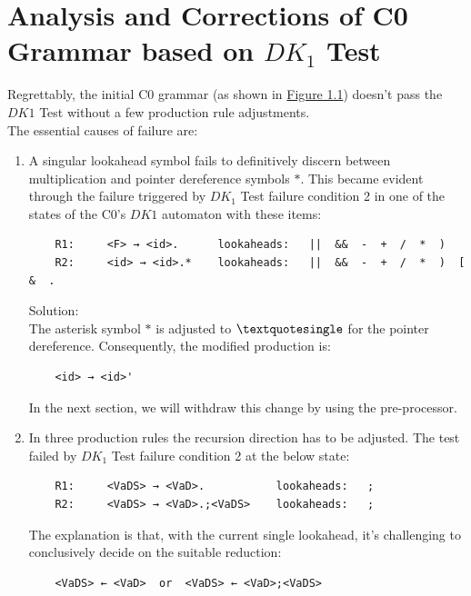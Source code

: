 \newpage


\section{Analysis and Corrections of C0 Grammar based on \(DK_{1}\) Test}\label{sec:Analysis and Corrections of C0 Grammar based on DK1 Test}

Regrettably, the initial C0 grammar (as shown in \hyperref[fig:grammar_c0]{Figure 1.1}) doesn’t pass the \(DK1\) Test without a few production rule adjustments.\\

The essential causes of failure are:

\begin{enumerate}
    \item A singular lookahead symbol fails to definitively discern between multiplication and pointer dereference symbols \(\ast\). This became evident through the failure triggered by \({DK_{1}}\) Test failure condition 2 in one of the states of the C0's \(DK1\) automaton with these items:
    \begin{verbatim}
    R1:     <F> → <id>.      lookaheads:   ||  &&  -  +  /  *  )
    R2:     <id> → <id>.*    lookaheads:   ||  &&  -  +  /  *  )  [  &  .
    \end{verbatim}
    Solution: \\
    The asterisk symbol \(\ast\) is adjusted to \(\textquotesingle\) for the pointer dereference. Consequently, the modified production is:
    \begin{verbatim}
    <id> → <id>'
    \end{verbatim}
    In the next section, we will withdraw this change by using the pre-processor.

    \item In three production rules the recursion direction has to be adjusted.
    The test failed by \({DK_{1}}\) Test failure condition 2 at the below state:
    \begin{verbatim}
    R1:     <VaDS> → <VaD>.           lookaheads:   ;
    R2:     <VaDS> → <VaD>.;<VaDS>    lookaheads:   ;
    \end{verbatim}
    The explanation is that, with the current single lookahead, it’s challenging to conclusively decide on the suitable reduction:
    \begin{verbatim}
    <VaDS> ← <VaD>  or  <VaDS> ← <VaD>;<VaDS>
    \end{verbatim}


\end{enumerate}
